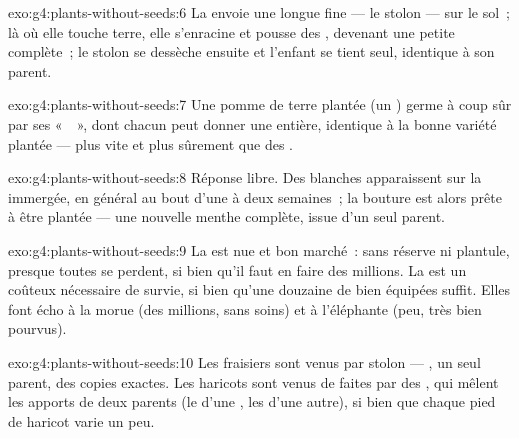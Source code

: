 \begin{solution}{exo:g4:plants-without-seeds:6}
La  envoie une longue  fine --- le stolon --- sur le sol~;
là où elle touche terre, elle s'enracine et pousse des ,
devenant une petite  complète~; le stolon se dessèche ensuite
et l'enfant se tient seul, identique à son parent.
\end{solution}

\begin{solution}{exo:g4:plants-without-seeds:7}
Une pomme de terre plantée (un ) germe à coup sûr par ses
«~~», dont chacun peut donner une  entière, identique à la
bonne variété plantée --- plus vite et plus sûrement que des .
\end{solution}

\begin{solution}{exo:g4:plants-without-seeds:8}
Réponse libre. Des  blanches apparaissent sur la 
immergée, en général au bout d'une à deux semaines~; la bouture est
alors prête à être plantée --- une nouvelle menthe complète, issue
d'un seul parent.
\end{solution}

\begin{solution}{exo:g4:plants-without-seeds:9}
La  est nue et bon marché~: sans réserve ni plantule, presque
toutes se perdent, si bien qu'il faut en faire des millions. La
 est un coûteux nécessaire de survie, si bien qu'une douzaine
de  bien équipées suffit. Elles font écho à la morue (des
millions, sans soins) et à l'éléphante (peu, très bien pourvus).
\end{solution}

\begin{solution}{exo:g4:plants-without-seeds:10}
Les fraisiers sont venus par stolon --- , un
seul parent, des copies exactes. Les haricots sont venus de 
faites par des , qui mêlent les apports de deux parents (le
 d'une , les  d'une autre), si bien que
chaque pied de haricot varie un peu.
\end{solution}

